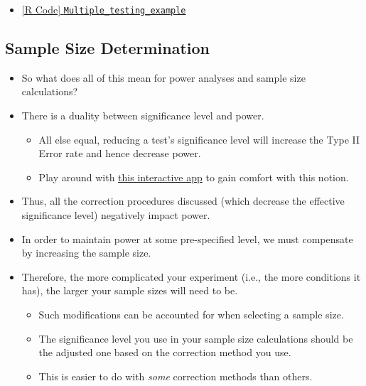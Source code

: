 \begin{itemize}
\begin{itemize}
\begin{Example}{Benjamini-Hochberg Procedure's Adjusted $ p $-values}{}
\[\begin{array}{cccl}
                            \end{array} \]
                        Thus, $ p_1^\star=p_{(2)}^\star=0.029 $, $ p_2^\star=p_{(4)}^\star=0.029 $, $ p_3^\star=p_{(1)}^\star=0.029 $,
                        and $ p_4^\star=p_{(3)}^\star=0.029 $. Comparing to $ \alpha^\star=0.05 $,
                        we reject all $ \mathbf{H}_{0} $'s.
                    \end{Example}
          \end{itemize}
    \item \href{https://github.com/Hextical/university-notes/blob/master/year-3/semester-3/STAT 430/code/W4/Multiple_testing_example.R}{[R Code] \texttt{Multiple\_testing\_example}}
\end{itemize}
\subsection{Sample Size Determination}
\begin{itemize}
    \item So what does all of this mean for power analyses and sample size calculations?
    \item There is a duality between significance level and power.
          \begin{itemize}
              \item All else equal, reducing a test's significance level will increase the Type II Error rate and hence
                    decrease power.
              \item Play around with \href{https://nathaniel-t-stevens.shinyapps.io/ErrorIllustrator/}{this interactive app} to gain comfort with this notion.
          \end{itemize}
    \item Thus, all the correction procedures discussed (which decrease the effective significance level)
          negatively impact power.
    \item In order to maintain power at some pre-specified level, we must compensate by increasing the sample
          size.
    \item Therefore, the more complicated your experiment (i.e., the more conditions it has), the larger your
          sample sizes will need to be.
          \begin{itemize}
              \item Such modifications can be accounted for when selecting a sample size.
              \item The significance level you use in your sample size calculations should be the adjusted one based
                    on the correction method you use.
              \item This is easier to do with \emph{some} correction methods than others.
          \end{itemize}
\end{itemize}
